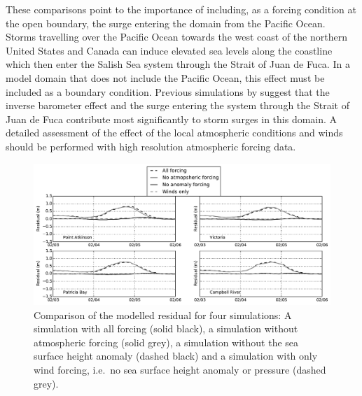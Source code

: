 \documentclass[pdftex,10pt]{article}
\begin{document}
These comparisons point to the importance of including, as a forcing condition at the open boundary, the surge entering the domain from the Pacific Ocean. Storms travelling over the Pacific Ocean towards the west coast of the northern United States and Canada can induce elevated sea levels along the coastline which then enter the Salish Sea system through the Strait of Juan de Fuca. In a model domain that does not include the Pacific Ocean, this effect must be included as a boundary condition. Previous simulations by \citet{murty1995storm} suggest that the inverse barometer effect and the surge entering the system through the Strait of Juan de Fuca contribute most significantly to storm surges in this domain.  A detailed assessment of the effect of the local atmospheric conditions and winds should be performed with high resolution atmospheric forcing data.  

\begin{figure}
\centering
\includegraphics[scale=0.6]{Figures/feb2006_factors.pdf}
\caption{Comparison of the modelled residual for four simulations: A simulation with all forcing (solid black), a simulation without atmospheric forcing (solid grey), a simulation without the sea surface height anomaly (dashed black) and a simulation with only wind forcing, i.e.\ no sea surface height anomaly or pressure (dashed grey). }
\label{fig:factors}
\end{figure}
\end{document}
